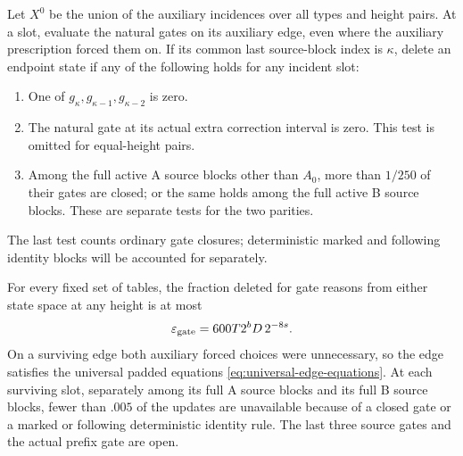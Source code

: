 Let $X^0$ be the union of the auxiliary incidences over all types and
height pairs.  At a slot, evaluate the natural gates on its auxiliary
edge, even where the auxiliary prescription forced them on.  If its
common last source-block index is $\kappa$, delete an endpoint state if
any of the following holds for any incident slot:
\begin{enumerate}
\item One of $g_{\kappa},g_{\kappa-1},g_{\kappa-2}$ is zero.
\item The natural gate at its actual extra correction interval is zero.
This test is omitted for equal-height pairs.
\item Among the full active A source blocks other than $A_0$, more than
$1/250$ of their gates are closed; or the same holds among the full
active B source blocks.  These are separate tests for the two parities.
\end{enumerate}
The last test counts ordinary gate closures; deterministic marked and
following identity blocks will be accounted for separately.

\begin{lemma}\label{lem:gate-deletions}
For every fixed set of tables, the fraction deleted for gate reasons
from either state space at any height is at most
\begin{equation}\label{eq:gate-budget}
 \varepsilon_{\rm gate}=600T2^bD\,2^{-8s}.
\end{equation}
On a surviving edge both auxiliary forced choices were unnecessary, so
the edge satisfies the universal padded equations
\eqref{eq:universal-edge-equations}.  At each surviving slot, separately
among its full A source blocks and its full B source blocks, fewer than
$.005$ of the updates are unavailable because of a closed gate or a
marked or following deterministic identity rule.  The last three source
gates and the actual prefix gate are open.
\end{lemma}

